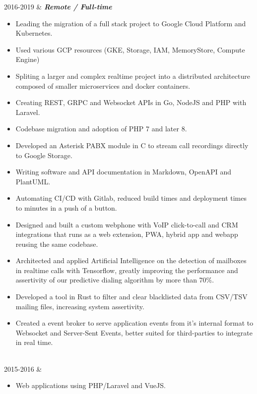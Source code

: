 \documentclass[]{cv-mauri}
\begin{document}
\begin{tabularcv}
    2016-2019   &   
		    		\textbf{\textit{Remote / Full-time}}
		    \begin{itemize}
		    	\item Leading the migration of a full stack project to Google Cloud Platform and Kubernetes.
		    	\item Used various GCP resources (GKE, Storage, IAM, MemoryStore, Compute Engine)
		    	\item Spliting a larger and complex realtime project into a distributed architecture composed of smaller microservices and docker containers.
		    	\item Creating REST, GRPC and Websocket APIs in Go, NodeJS and PHP with Laravel.
		    	\item Codebase migration and adoption of PHP 7 and later 8.
		    	\item Developed an Asterisk PABX module in C to stream call recordings directly to Google Storage.
		    	\item Writing software and API documentation in Markdown, OpenAPI and PlantUML.
		    	\item Automating CI/CD with Gitlab, reduced build times and deployment times to minutes in a push of a button.
		    	\item Designed and built a custom webphone with VoIP click-to-call and CRM integrations that runs as a web extension, PWA, hybrid app and webapp reusing the same codebase.
		    	\item Architected and applied Artificial Intelligence on the detection of mailboxes in realtime calls with Tensorflow, greatly improving the performance and assertivity of our predictive dialing algorithm by more than 70\%.
		    	\item Developed a tool in Rust to filter and clear blacklisted data from CSV/TSV mailing files, increasing system assertivity.
		    	\item Created a event broker to serve application events from it's internal format to Websocket and Server-Sent Events, better suited for third-parties to integrate in real time.
			\end{itemize}

		    \\[\vspacepar]
    2015-2016   &   
            \begin{itemize}
                  	\item Web applications using PHP/Laravel and VueJS.
            \end{itemize}
                    

\end{tabularcv}
\end{document}

